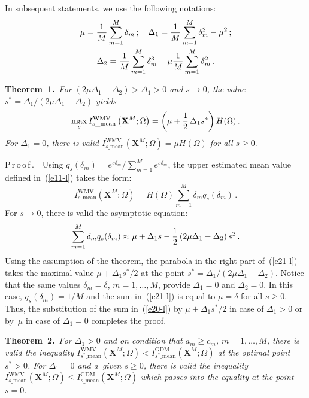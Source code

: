 \begin{multicols}{2}
In subsequent statements, we use the following notations:  
\begin{gather*}
\mu=\displaystyle\frac{\displaystyle 1\mathstrut}{\displaystyle M\mathstrut}\sum\limits_{m=1}^M \delta_m\,;\quad 
\Delta_1=\displaystyle\frac{\displaystyle 1\mathstrut}{\displaystyle M\mathstrut}\sum\limits^M_{m=1} \delta^2_m-\mu^2\,;\\
\Delta_2=\displaystyle\frac{\displaystyle 1\mathstrut}{\displaystyle M\mathstrut}\sum\limits^M_{m=1} \delta_m^3-
\mu\displaystyle\frac{\displaystyle 1\mathstrut}{\displaystyle M\mathstrut}\sum\limits^M_{m=1} \delta^2_m\,.
\end{gather*}

\noindent
\textbf{Theorem~1.}\ \textit{For $(2\mu\Delta_1-\Delta_2)>\Delta_1 >0$ and 
$s\to 0$, the value $s^*=\Delta_1/(2\mu \Delta_1-\Delta_2)$ yields}
$$
\max\limits_s I^{\mathrm{WMV}}_{s\_\mathrm{mean}} \left(\mathbf{X}^M;\Omega\right) =
\left( 
\mu+\displaystyle\frac{\displaystyle 1\mathstrut}{\displaystyle 2\mathstrut}\,\Delta_1 s^*\right) H(\Omega)\,.
$$
\textit{For $\Delta_1=0$, there is valid $I^{\mathrm{WMV}}_{s\_\mathrm{mean}} 
(\mathbf{X}^M;\Omega) =\mu H(\Omega)$ for all $s\geq 0$}.

\smallskip

\noindent
P\,r\,o\,o\,f\,.\ \  Using $q_s(\delta_m) =e^{s\delta_m}/\sum\nolimits^M_{m=1} 
e^{s\delta_m}$,  the upper estimated mean value defined in~(\ref{e11-l}) takes the 
form: 
\begin{equation}
I^{\mathrm{WMV}}_{s\_\mathrm{mean}} (\mathbf{X}^M;\Omega) =H(\Omega) 
\sum\limits^M_{m=1} \delta_m q_s(\delta_m)\,.
\label{e20-l}
\end{equation}
For $s\to 0$, there is valid the asymptotic equation: 
\begin{equation}
\sum\limits^M_{m=1} \delta_m q_s(\delta_m) \approx \mu+ \Delta_1 s-
\displaystyle\frac{\displaystyle 1\mathstrut}{\displaystyle 2\mathstrut}\left( 2\mu \Delta_1-\Delta_2\right) s^2\,.
\label{e21-l}
\end{equation}
Using the assumption of the theorem, the parabola in the right part of~(\ref{e21-l}) 
takes the maximal value $\mu+\Delta_1 s^*/2$ at the point $s^*=\Delta_1/(2\mu 
\Delta_1-\Delta_2)$. Notice that the same values $\delta_m=\delta$, $m=1,\ldots , 
M$, provide $\Delta_1=0$ and $\Delta_2=0$. In this case, $q_s(\delta_m)=1/M$ 
and the sum in~(\ref{e21-l}) is equal to $\mu=\delta$ for all $s\geq0$. Thus, the 
substitution of the sum in~(\ref{e20-l}) by $\mu+\Delta_1 s^*/2$ in case of 
$\Delta_1>0$ or by~$\mu$ in case of $\Delta_1=0$ completes the proof.


\smallskip

\noindent
\textbf{Theorem~2.}\ \textit{For $\Delta_1>0$ and on condition that $a_m\geq 
c_m$, $m=1,\ldots , M$, there is valid the inequality $I^{\mathrm{WMV}}_{s^*\_\mathrm{mean}} 
(\mathbf{X}^M;\Omega)<I^{\mathrm{GDM}}_{s^*\_\mathrm{mean}} (\mathbf{X}^M;\Omega)$ at 
the optimal point $s^*>0$.  For $\Delta_1=0$ and a~given $s\geq 0$, there is valid 
the inequality $I^{\mathrm{WMV}}_{s\_\mathrm{mean}} (\mathbf{X}^M;\Omega) \leq 
I^{\mathrm{GDM}}_{s\_\mathrm{mean}} (\mathbf{X}^M;\Omega)$ which passes into the equality at 
the point $s=0$.}


\end{multicols}
